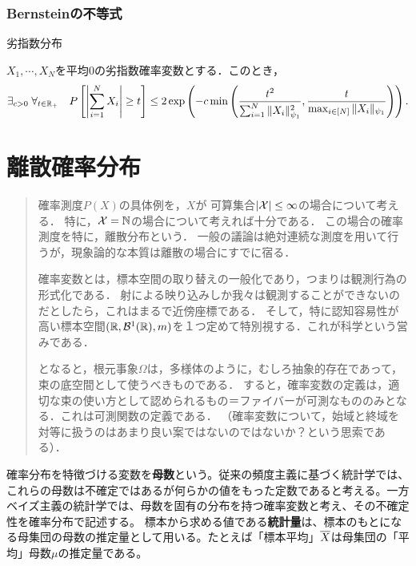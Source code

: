 \documentclass[uplatex,dvipdfmx]{jsreport}
\begin{document}
\subsection{Bernsteinの不等式}

\begin{tcolorbox}[colframe=ForestGreen, colback=ForestGreen!10!white,breakable,colbacktitle=ForestGreen!40!white,coltitle=black,fonttitle=\bfseries\sffamily,
title=]
    劣指数分布
\end{tcolorbox}

\begin{theorem}
    $X_1,\cdots,X_N$を平均$0$の劣指数確率変数とする．このとき，
    \[\exists_{c>0}\;\forall_{t\in\mathbb{R}_+}\quad P\left[\left|\sum^N_{i=1}X_i\right|\ge t\right]\le 2\exp\left(-c\min\left(\frac{t^2}{\sum^N_{i=1}\|X_i\|^2_{\psi_1}},\frac{t}{\max_{i\in[N]}\|X_i\|_{\psi_1}}\right)\right).\]
\end{theorem}

\chapter{離散確率分布}

\begin{quotation}
    確率測度$P(X)$の具体例を，$X$が
    可算集合$\lvert\mathcal{X}\rvert\le\infty$の場合について考える．
    特に，$\mathcal{X}=\mathbb{N}$の場合について考えれば十分である．
    この場合の確率測度を特に，離散分布という．
    一般の議論は絶対連続な測度を用いて行うが，現象論的な本質は離散の場合にすでに宿る．

    確率変数とは，標本空間の取り替えの一般化であり，つまりは観測行為の形式化である．
    射による映り込みしか我々は観測することができないのだとしたら，これはまるで近傍座標である．
    そして，特に認知容易性が高い標本空間$(\mathbb{R},\mathcal{B}^1(\mathbb{R}),m)$を１つ定めて特別視する．これが科学という営みである．
    
    となると，根元事象$\Omega$は，多様体のように，むしろ抽象的存在であって，束の底空間として使うべきものである．
    すると，確率変数の定義は，適切な束の使い方として認められるもの＝ファイバーが可測なもののみとなる．これは可測関数の定義である．
    （確率変数について，始域と終域を対等に扱うのはあまり良い案ではないのではないか？という思索である）．
\end{quotation}

\begin{remark*}[statistics]
    確率分布を特徴づける変数を\textbf{母数}という。従来の頻度主義に基づく統計学では、これらの母数は不確定ではあるが何らかの値をもった定数であると考える。一方ベイズ主義の統計学では、母数を固有の分布を持つ確率変数と考え、その不確定性を確率分布で記述する。 
    標本から求める値である\textbf{統計量}は、標本のもとになる母集団の母数の推定量として用いる。たとえば「標本平均」$\overline{X}$は母集団の「平均」母数$\mu$の推定量である。
\end{remark*}
\end{document}
